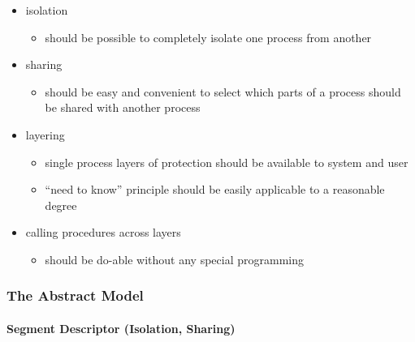 \documentclass[
  12pt]{findlay}
\providecommand{\tightlist}{%
  \setlength{\itemsep}{0pt}\setlength{\parskip}{0pt}}
\begin{document}
\begin{itemize}
\tightlist
\item
  isolation

  \begin{itemize}
  \tightlist
  \item
    should be possible to completely isolate one process from another
  \end{itemize}
\item
  sharing

  \begin{itemize}
  \tightlist
  \item
    should be easy and convenient to select which parts of a process
    should be shared with another process
  \end{itemize}
\item
  layering

  \begin{itemize}
  \tightlist
  \item
    single process layers of protection should be available to system
    and user
  \item
    ``need to know'' principle should be easily applicable to a
    reasonable degree
  \end{itemize}
\item
  calling procedures across layers

  \begin{itemize}
  \tightlist
  \item
    should be do-able without any special programming
  \end{itemize}
\end{itemize}

\hypertarget{the-abstract-model}{%
\subsubsection{The Abstract Model}\label{the-abstract-model}}

\hypertarget{segment-descriptor-isolation-sharing}{%
\paragraph{Segment Descriptor (Isolation,
Sharing)}\label{segment-descriptor-isolation-sharing}}
\end{document}
